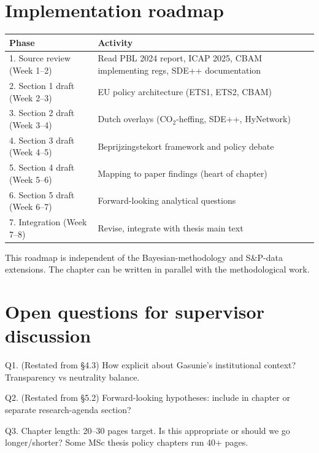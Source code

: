 \documentclass[11pt,a4paper]{article}
\begin{document}
\newpage

\section{Implementation roadmap}

\begin{table}[h]
\centering
\begin{tabular}{lp{9cm}}
\toprule
\textbf{Phase} & \textbf{Activity} \\
\midrule
1. Source review (Week 1--2) & Read PBL 2024 report, ICAP 2025, CBAM implementing regs, SDE++ documentation \\
2. Section 1 draft (Week 2--3) & EU policy architecture (ETS1, ETS2, CBAM) \\
3. Section 2 draft (Week 3--4) & Dutch overlays (CO$_2$-heffing, SDE++, HyNetwork) \\
4. Section 3 draft (Week 4--5) & Beprijzingstekort framework and policy debate \\
5. Section 4 draft (Week 5--6) & Mapping to paper findings (heart of chapter) \\
6. Section 5 draft (Week 6--7) & Forward-looking analytical questions \\
7. Integration (Week 7--8) & Revise, integrate with thesis main text \\
\bottomrule
\end{tabular}
\end{table}

This roadmap is independent of the Bayesian-methodology and S\&P-data extensions. The chapter can be written in parallel with the methodological work.

\section{Open questions for supervisor discussion}

\begin{openquestion}
Q1. (Restated from §4.3) How explicit about Gasunie's institutional context? Transparency vs neutrality balance.
\end{openquestion}

\begin{openquestion}
Q2. (Restated from §5.2) Forward-looking hypotheses: include in chapter or separate research-agenda section?
\end{openquestion}

\begin{openquestion}
Q3. Chapter length: 20--30 pages target. Is this appropriate or should we go longer/shorter? Some MSc thesis policy chapters run 40+ pages.
\end{openquestion}
\end{document}
